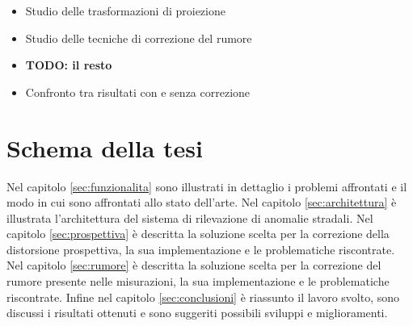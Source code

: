 \begin{itemize}
	\item Studio delle trasformazioni di proiezione
	\item Studio delle tecniche di correzione del rumore
	\item \textbf{TODO: il resto}
	\item Confronto tra risultati con e senza correzione
\end{itemize}

\section{Schema della tesi}

Nel capitolo \ref{sec:funzionalita} sono illustrati in dettaglio i problemi affrontati e il modo in cui sono affrontati allo stato dell'arte.
Nel capitolo \ref{sec:architettura} è illustrata l'architettura del sistema di rilevazione di anomalie stradali.
Nel capitolo \ref{sec:prospettiva} è descritta la soluzione scelta per la correzione della distorsione prospettiva, la sua implementazione e le problematiche riscontrate.
Nel capitolo \ref{sec:rumore} è descritta la soluzione scelta per la correzione del rumore presente nelle misurazioni, la sua implementazione e le problematiche riscontrate.
Infine nel capitolo \ref{sec:conclusioni} è riassunto il lavoro svolto, sono discussi i risultati ottenuti e sono suggeriti possibili sviluppi e miglioramenti.
